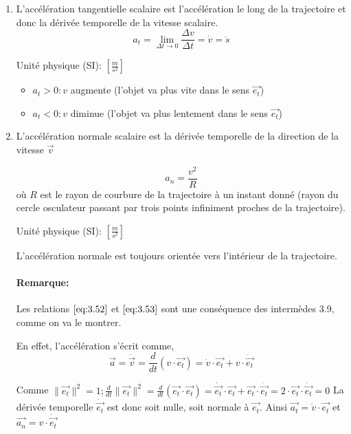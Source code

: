 \documentclass[
    11pt,
    a4paper,
    oneside,
    headinlcude, footinclude,
    twoside,
]{report}
\renewcommand{\vec}[1]{\overrightarrow{#1}}
\begin{document}
\begin{enumerate}
    \item L'accélération tangentielle scalaire est l'accélération le long de la
        trajectoire et donc la dérivée temporelle de la vitesse scalaire.
        \begin{equation}
            \label{eq:3.52}
            a_{t} = \lim_{\Delta t \to 0} \frac{\Delta v}{\Delta t} = 
            \dot v = \ddot s 
        \end{equation}

        Unité physique (SI): $\left[\frac{m}{s^{2}}\right]$
        \begin{itemize}
            \item $a_{t} > 0: v$ augmente (l'objet va plus vite dans le sens $\vec{e_{t}}$)
            \item $a_{t} < 0: v$ diminue (l'objet va plus lentement dans le sens $\vec{e_{t}}$)
        \end{itemize}

    \item L'accélération normale scalaire est la dérivée temporelle de la
        direction de la vitesse $\vec v$

        \begin{equation}
            \label{eq:3.53}
            a_{n} = \frac{v^{2}}{R}
        \end{equation}
        où $R$ est le rayon de courbure de la trajectoire à un instant donné
        (rayon du cercle osculateur passant par trois points infiniment proches
        de la trajectoire).

        Unité physique (SI): $\left[\frac{m}{s^{2}}\right]$

        L'accélération normale est toujours orientée vers l'intérieur de la
        trajectoire.

        \paragraph{Remarque:}
        
        Les relations $\eqref{eq:3.52}$ et $\eqref{eq:3.53}$ sont une
        conséquence des intermèdes 3.9, comme on va le montrer.

        En effet, l'accélération s'écrit comme,
        $$\vec a = \dot{\vec v} = \frac{d}{dt} (v \cdot \vec{e_{t}}) = \dot v
        \cdot \vec{e_{t}} + v \cdot \dot{\vec{e_{t}}}$$

        Comme  $\| \vec{e_{t}}\|^{2} = 1; \frac{d}{dt} \|\vec{e_{t}}\|^{2} =
        \frac{d}{dt} (\vec{e_{t}} \cdot \vec{e_{t}}) = \dot{\vec{e_{t}}} \cdot
        \vec{e_{t}} + \vec{e_{t}}\cdot \dot{\vec{e_{t}}} = 2 \cdot \vec{e_{t}}
        \cdot \dot{\vec{e_{t}}} = 0$
        La dérivée temporelle $\dot{\vec{e_{t}}}$ est donc soit nulle, soit
        normale à $\vec{e_{t}}$. Ainsi $\vec{a_{t}} = \dot v \cdot \vec{e_{t}}$
        et $\vec{a_{n}} = v \cdot \dot{\vec{e_{t}}}$


\end{enumerate}
\end{document}

